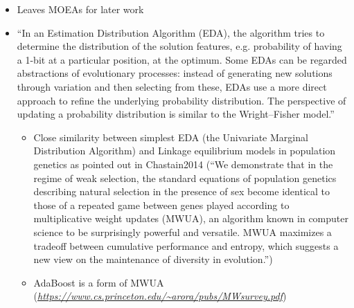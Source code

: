 \begin{itemize}
	\item
	
	Leaves MOEAs for later work
	
	\item
	
	``In an Estimation Distribution Algorithm (EDA), the algorithm tries
	to determine the distribution of the solution features, e.g.
	probability of having a 1-bit at a particular position, at the
	optimum. Some EDAs can be regarded abstractions of evolutionary
	processes: instead of generating new solutions through variation and
	then selecting from these, EDAs use a more direct approach to refine
	the underlying probability distribution. The perspective of updating a
	probability distribution is similar to the Wright--Fisher model.''
	
	
	\begin{itemize}
		\item
		
		Close similarity between simplest EDA (the Univariate Marginal
		Distribution Algorithm) and Linkage equilibrium models in population
		genetics as pointed out in Chastain2014 (``We demonstrate that in
		the regime of weak selection, the standard equations of population
		genetics describing natural selection in the presence of sex become
		identical to those of a repeated game between genes played according
		to multiplicative weight updates (MWUA), an algorithm known in
		computer science to be surprisingly powerful and versatile. MWUA
		maximizes a tradeoff between cumulative performance and entropy,
		which suggests a new view on the maintenance of diversity in
		evolution.'')
		
		\item
		
		AdaBoost is a form of MWUA
		(\href{https://www.cs.princeton.edu/~arora/pubs/MWsurvey.pdf}{\emph{https://www.cs.princeton.edu/\textasciitilde{}arora/pubs/MWsurvey.pdf}})
		
	\end{itemize}
\end{itemize}

\autocite{Barton2014}

